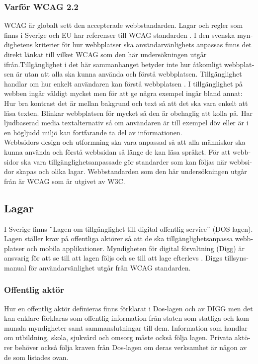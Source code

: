 \documentclass[11p]{article}
\begin{document}
\begin{otherlanguage}{swedish}
    \subsubsection{Varför WCAG 2.2}
    WCAG är globalt sett den accepterade webbstandarden.
    Lagar och regler som finns i Sverige och EU har referenser till WCAG standarden \parencite{Utförande_av_Dos_lagen}.
    I den svenska myndighetens kriterier för hur webbplatser ska användarvänlighets anpassas finns det direkt länkat till vilket WCAG som den här undersökningen utgår ifrån.Tillgänglighet i det här sammanhanget betyder inte hur åtkomligt webbplatsen är utan att alla ska kunna använda och förstå webbplatsen. %
    Tillgänglighet handlar om hur enkelt användaren kan förstå webbplatsen \parencite{webbriktlinjer}.
    I tillgänglighet på webben ingår väldigt mycket men för att ge några exempel ingår bland annat:
    Hur bra kontrast det är mellan bakgrund och text så att det ska vara enkelt att läsa texten.
    Blinkar webbplatsen för mycket så den är obehaglig att kolla på.
    Har ljudbaserad media textalternativ så om användaren är till exempel döv eller är i en högljudd miljö kan fortfarande ta del av informationen.
    \\Webbsidors design och utformning ska vara anpassad så att alla människor ska kunna använda och förstå webbsidan så länge de kan läsa språket.
    För att webbsidor ska vara tillgänglighetsanpassade gör standarder som kan följas när webbsidor skapas och olika lagar.
    Webbstandarden som den här undersökningen utgår från är WCAG som är utgivet av W3C.


    \subsection{Lagar}
    I Sverige finns ¨Lagen om tillgänglighet till digital offentlig service¨ (DOS-lagen)\parencite{Dos-lagen}.
    Lagen ställer krav på offentliga aktörer så att de ska tillgänglighetsanpassa webbplatser och mobila applikationer.
    Myndigheten för digital förvaltning (Digg) är ansvarig för att se till att lagen följs och se till att lage efterlevs \parencite{Utförande_av_Dos_lagen}.
    Diggs tillsynsmanual för användarvänlighet utgår från WCAG standarden. %

    \subsubsection{Offentlig aktör}
    Hur en offentlig aktör definieras finns förklarat i Dos-lagen \parencite{Dos-lagen} och av DIGG \parencite{Om_Dos-lagen} men det kan enklare förklaras som offentlig information från staten som statliga och kommunala myndigheter samt sammanslutningar till dem.
    Information som handlar om utbildning, skola, sjukvård och omsorg måste också följa lagen.
    Privata aktörer behöver också följa kraven från Dos-lagen om deras verksamhet är någon av de som listades ovan.


\end{otherlanguage}
\end{document}
